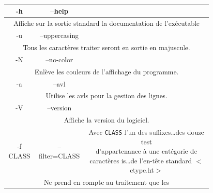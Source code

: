 \documentclass[12pt]{article}
\begin{document}
    \begin{figure}[H]
        \centering
        \begin{tabular}{|c|c|c|}
            \hline
                \cellcolor{blue-s!25} -h & \cellcolor{blue-s!25} --help  &
                \cellcolor{blue-t!70}\\
            \hline
                \multicolumn{3}{|c|}{\cellcolor{blue-u!7}Affiche sur la sortie 
                standard la documentation de l'exécutable}\\
            \hline
                \cellcolor{blue-s!25} -u  & \cellcolor{blue-s!25} --uppercasing 
                & \cellcolor{blue-t!70} \\
            \hline
                \multicolumn{3}{|c|}{\cellcolor{blue-u!7}Tous les caractères 
                traiter seront en sortie en majuscule.}\\
            \hline 
                \cellcolor{blue-s!25} -N & \cellcolor{blue-s!25} --no-color  & 
                \cellcolor{blue-t!70} \\
            \hline
                \multicolumn{3}{|c|}{\cellcolor{blue-u!7}Enlève les couleurs de 
                l'affichage du programme.}\\
            \hline
                \cellcolor{blue-s!25} -a & \cellcolor{blue-s!25} --avl & 
                \cellcolor{blue-t!70} \\
            \hline
                \multicolumn{3}{|c|}{\cellcolor{blue-u!7}Utilise les avls pour 
                la gestion des lignes.}\\
            \hline
                \cellcolor{blue-s!25} -V & \cellcolor{blue-s!25} --version & 
                \cellcolor{blue-t!70} \\
            \hline
                \multicolumn{3}{|c|}{\cellcolor{blue-u!7}Affiche la version du  
                logiciel.}\\
            \hline
                \cellcolor{blue-s!25} -f CLASS & \cellcolor{blue-s!25} 
                --filter=CLASS & \rule{0pt}{2.6em}\cellcolor{blue-s!25}
                {\parbox{9cm}{ Avec \texttt{CLASS} l’un des 
                suffixes\ldots des douze test\\ d’appartenance à une catégorie 
                de caractères is\ldots de l’en-tête standard $<$ctype.ht$>$}} \\
                [1.3em]
            \hline
                \multicolumn{3}{|c|}{\cellcolor{blue-u!7}\rule{0pt}{2em}
                \parbox{15cm}{Ne prend en compte au traitement que les 
}}
\end{tabular}
\end{figure}
\end{document}
